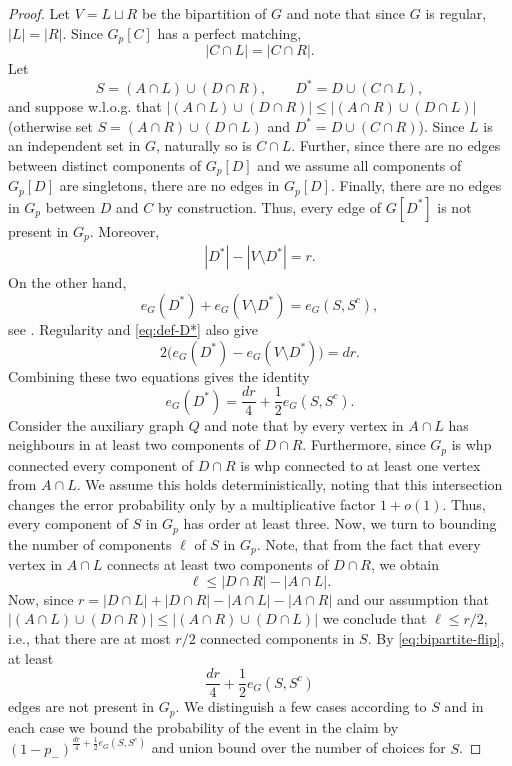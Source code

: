 \documentclass[notitlepage]{scrartcl}
\begin{document}
\begin{proof}
Let $V=L\sqcup R$ be the bipartition of $G$ and note that since $G$ is regular, $|L|=|R|$. Since $G_p[C]$ has a perfect matching,
\[
 |C\cap L|=|C\cap R|.
\]
Let
\[
 S=(A\cap L)\cup(D\cap R), \qquad D^*=D\cup(C\cap L),
\]
and suppose w.l.o.g. that $|(A\cap L)\cup(D\cap R)| \leq |(A\cap R)\cup(D\cap L)|$ (otherwise set $S=(A \cap R) \cup (D \cap L)$ and $D^*=D \cup (C \cap R)$).
Since $L$ is an independent set in $G$, naturally so is $C\cap L$. Further, since there are no edges between distinct components of $G_p[D]$ and we assume all components of $G_p[D]$ are singletons, there are no edges in $G_p[D]$. Finally, there are no edges in $G_p$ between $D$ and $C$ by construction. Thus, every edge of $G[D^*]$ is not present in $G_p$. 
Moreover,
\begin{align} \label{eq:def-D*}
     |D^*|-|V\setminus D^*|=r.
\end{align}
On the other hand,
\[
 e_G(D^*)+e_G(V\setminus D^*)=e_G(S,S^c),
\]
see .
Regularity and \eqref{eq:def-D*} also give
\[
 2\bigl(e_G(D^*)-e_G(V\setminus D^*)\bigr)=dr.
\]
Combining these two equations gives the identity
\begin{equation}\label{eq:bipartite-flip}
 e_G(D^*)=\frac{dr}{4}+\frac12e_G(S,S^c).
\end{equation}
Consider the auxiliary graph $Q$ and note that by  every vertex in $A \cap L$ has neighbours in at least two components of $D\cap R$.
Furthermore, since $G_p$ is whp connected every component of $D\cap R$ is whp connected to at least one vertex from $A \cap L$. We assume this holds deterministically, noting that this intersection changes the error probability only by a multiplicative factor $1+o(1)$. Thus, every component of $S$ in $G_p$ has order at least three. Now, we turn to bounding the number of components $\ell$ of $S$ in $G_p$. Note, that from the fact that every vertex in $A \cap L$ connects at least two components of $D\cap R$, we obtain
\[
\ell \leq |D \cap R|-|A \cap L|.
\]
Now, since $r=|D \cap L| + |D \cap R| - |A \cap L| - |A \cap R|$ and our assumption that $|(A\cap L)\cup(D\cap R)| \leq |(A\cap R)\cup(D\cap L)|$ we conclude that $\ell \leq r/2$, i.e., that there are at most $r/2$ connected components in $S$. By \eqref{eq:bipartite-flip}, at least
\[
\frac{dr}{4} + \frac{1}{2} e_G(S, S^c)
\]
edges are not present in $G_p$. We distinguish a few cases according to $S$ and in each case we bound the probability of the event in the claim by $(1-p_-)^{\frac{dr}{4} + \frac{1}{2} e_G(S, S^c)}$ and union bound over the number of choices for $S$.


\end{proof}
\end{document}
